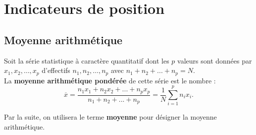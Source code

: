 \section{Indicateurs de position} %

%
%
%

\subsection{Moyenne arithmétique} %

\begin{definition}[Moyenne]
   Soit la série statistique à caractère quantitatif dont les $p$ valeurs sont données par $x_1, x_2, \dots, x_p$ d'effectifs $n_1, n_2, \dots, n_p$ avec $n_1+n_2+...+n_p =N$. \\
   La \textbf{moyenne arithmétique pondérée} de cette série est le nombre :
   $$\overline{x}=\frac{n_1x_1+n_2x_2+...+n_px_p}{n_1+n_2+...+n_p}=\dfrac{1}{N}\sum_{i=1}^{p}{n_ix_i}.$$
\end{definition}

\medskip

Par la suite, on utilisera le terme {\bf moyenne} pour désigner la moyenne arithmétique.

